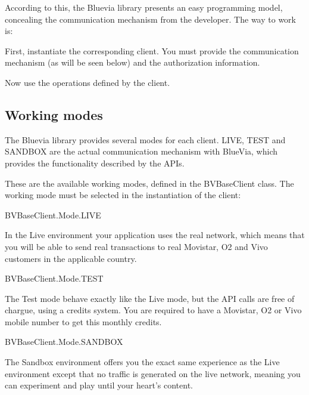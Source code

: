 According to this, the Bluevia library presents an easy programming model, concealing the communication mechanism from the developer. The way to work is:


\begin{DoxyItemize}
\item First, instantiate the corresponding client. You must provide the communication mechanism (as will be seen below) and the authorization information. 
\item Now use the operations defined by the client. 
\end{DoxyItemize}\hypertarget{main_programming_guidelines_working_modes_sec}{}\subsection{Working modes}\label{main_programming_guidelines_working_modes_sec}
The Bluevia library provides several modes for each client. LIVE, TEST and SANDBOX are the actual communication mechanism with BlueVia, which provides the functionality described by the APIs.

These are the available working modes, defined in the BVBaseClient class. The working mode must be selected in the instantiation of the client:


\begin{DoxyItemize}
\item BVBaseClient.Mode.LIVE \par
In the Live environment your application uses the real network, which means that you will be able to send real transactions to real Movistar, O2 and Vivo customers in the applicable country.


\item BVBaseClient.Mode.TEST \par
The Test mode behave exactly like the Live mode, but the API calls are free of chargue, using a credits system. You are required to have a Movistar, O2 or Vivo mobile number to get this monthly credits.


\item BVBaseClient.Mode.SANDBOX \par
The Sandbox environment offers you the exact same experience as the Live environment except that no traffic is generated on the live network, meaning you can experiment and play until your heart’s content. 
\end{DoxyItemize}

